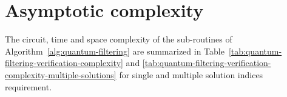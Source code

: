 
\section{Asymptotic complexity}
The circuit, time and space complexity of the sub-routines of Algorithm~\ref{alg:quantum-filtering} are summarized in Table~\ref{tab:quantum-filtering-verification-complexity} and \ref{tab:quantum-filtering-verification-complexity-multiple-solutions} for single and multiple solution indices requirement.

